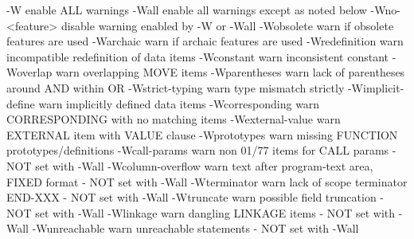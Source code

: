   -W                    enable ALL warnings
  -Wall                 enable all warnings except as noted below
  -Wno-<feature>        disable warning enabled by -W or -Wall
  -Wobsolete            warn if obsolete features are used
  -Warchaic             warn if archaic features are used
  -Wredefinition        warn incompatible redefinition of data items
  -Wconstant            warn inconsistent constant
  -Woverlap             warn overlapping MOVE items
  -Wparentheses         warn lack of parentheses around AND within OR
  -Wstrict-typing       warn type mismatch strictly
  -Wimplicit-define     warn implicitly defined data items
  -Wcorresponding       warn CORRESPONDING with no matching items
  -Wexternal-value      warn EXTERNAL item with VALUE clause
  -Wprototypes          warn missing FUNCTION prototypes/definitions
  -Wcall-params         warn non 01/77 items for CALL params
			- NOT set with -Wall
  -Wcolumn-overflow     warn text after program-text area, FIXED format
			- NOT set with -Wall
  -Wterminator          warn lack of scope terminator END-XXX
			- NOT set with -Wall
  -Wtruncate            warn possible field truncation
			- NOT set with -Wall
  -Wlinkage             warn dangling LINKAGE items
			- NOT set with -Wall
  -Wunreachable         warn unreachable statements
			- NOT set with -Wall

